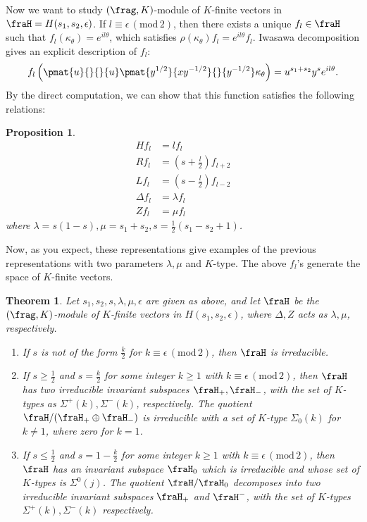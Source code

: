 \documentclass{article}
\newtheorem{theorem}{Theorem}[section]
\newcommand{\Mod}[1]{\,(\mathrm{mod}\,#1)}
\newtheorem{proposition}{Proposition}[section]
\begin{document}
Now we want to study $(\frag, K)$-module of $K$-finite vectors in $\fraH = H(s_{1}, s_{2}, \epsilon)$. 
If $l\equiv \epsilon\Mod{2}$, then there exists a unique $f_{l}\in \fraH$ such that $f_{l}(\kappa_{\theta}) = e^{il\theta}$, which satisfies $\rho(\kappa_{\theta})f_{l} = e^{il\theta}f_{l}$. 
Iwasawa decomposition gives an explicit description of $f_{l}$: 
$$
f_{l}\left( \pmat{u}{}{}{u} \pmat{y^{1/2}}{xy^{-1/2}}{}{y^{-1/2}} \kappa_{\theta}\right) = u^{s_{1} + s_{2}} y^{s} e^{il\theta}.
$$
By the direct computation, we can show that this function satisfies the following relations:
\begin{proposition}
\begin{align*}
Hf_{l} &= lf_{l} \\
Rf_{l} &= \left( s + \frac{l}{2}\right) f_{l+2} \\
Lf_{l} &= \left( s - \frac{l}{2}\right) f_{l-2} \\
\Delta f_{l} &= \lambda f_{l} \\
Zf_{l} &= \mu f_{l}
\end{align*}
where $\lambda = s(1-s), \mu = s_{1} + s_{2}, s = \frac{1}{2}(s_{1} - s_{2} +1)$. 
\end{proposition}
Now, as you expect, these representations give examples of the previous representations with two parameters $\lambda, \mu$ and $K$-type. 
The above $f_{l}$'s generate the space of $K$-finite vectors. 
\begin{theorem}
Let $s_{1}, s_{2}, s, \lambda, \mu, \epsilon$ are given as above, and let $\fraH$ be the $(\frag, K)$-module of $K$-finite vectors in $H(s_{1}, s_{2}, \epsilon)$, where $\Delta, Z$ acts as $\lambda, \mu$, respectively. 
\begin{enumerate}
\item If $s$ is not of the form $\frac{k}{2}$ for $k\equiv \epsilon\Mod{2}$, then $\fraH$ is irreducible. 
\item If $s\geq \frac{1}{2}$ and $s = \frac{k}{2}$ for some integer $k\geq 1$ with $k\equiv \epsilon\Mod{2}$, then $\fraH$ has two irreducible invariant subspaces $\fraH_{+}, \fraH_{-}$, with the set of $K$-types as $\Sigma^{+}(k), \Sigma^{-}(k)$, respectively. The quotient $\fraH/(\fraH_{+}\oplus \fraH_{-})$ is irreducible with a set of $K$-type $\Sigma_{0}(k)$ for $k\neq 1$, where zero for $k=1$. 
\item If $s\leq \frac{1}{2}$ and $s = 1-\frac{k}{2}$ for some integer $k\geq 1$ with $k\equiv \epsilon\Mod{2}$, then $\fraH$ has an invariant subspace $\fraH_{0}$ which is irreducible and whose set of $K$-types is $\Sigma^{0}(j)$. 
The quotient $\fraH/\fraH_{0}$ decomposes into two irreducible invariant subspaces $\fraH_{+}$ and $\fraH^{-}$, with the set of $K$-types $\Sigma^{+}(k), \Sigma^{-}(k)$ respectively. 
\end{enumerate}
\end{theorem}
\end{document}
